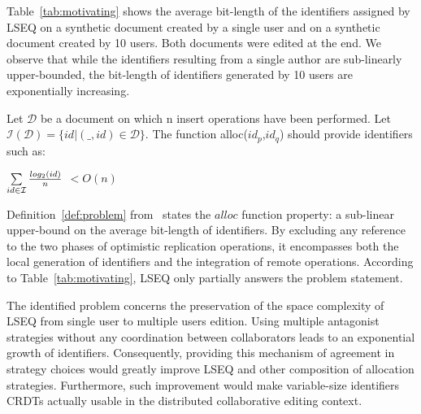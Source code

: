 Table~\ref{tab:motivating} shows the average bit-length of the identifiers
assigned by LSEQ on a synthetic document created by a single user and on a
synthetic document created by 10 users. Both documents were edited at the
end. We observe that while the identifiers resulting from a single author are
sub-linearly upper-bounded, the bit-length of identifiers generated by 10 users
are exponentially increasing.

\begin{Def}
  Let $\mathcal{D}$ be a document on which n insert operations have been
  performed. Let $\mathcal{I}(\mathcal{D}) = \{id|(\_, id) \in
  \mathcal{D}\}$. The function alloc($id_p$,$id_q$) should provide identifiers
  such as:
  \begin{center}
    $\sum\limits_{id \in \mathcal{I}} {{ log_2(id)}\over{n}} $ $< O(n)$
  \end{center}
\label{def:problem}
\end{Def}

Definition~\ref{def:problem} from~\cite{nedelec2013lseq} states the $alloc$
function property: a sub-linear upper-bound on the average bit-length of
identifiers. By excluding any reference to the two phases of optimistic
replication operations, it encompasses both the local generation of identifiers
and the integration of remote operations.  According to
Table~\ref{tab:motivating}, LSEQ only partially answers the problem statement.


The identified problem concerns the preservation of the space complexity of
LSEQ from single user to multiple users edition. Using multiple antagonist
strategies without any coordination between collaborators leads to an
exponential growth of identifiers. Consequently, providing this mechanism of
agreement in strategy choices would greatly improve LSEQ and other
composition of allocation strategies. Furthermore, such improvement would make
variable-size identifiers CRDTs actually usable in the distributed
collaborative editing context.

